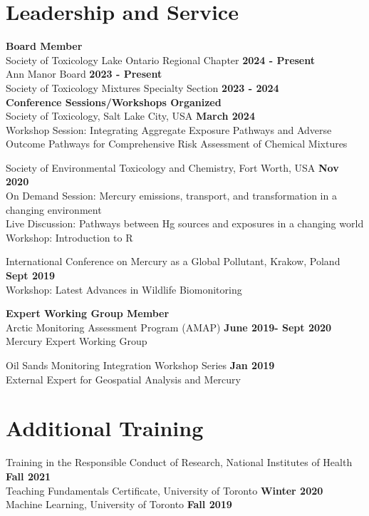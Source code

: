 \documentclass[margin,line]{res}
\begin{document}
\begin{resume}
\vspace*{.1in}

\section{\sc Leadership and Service}
{\bf Board Member}\\
{Society of Toxicology Lake Ontario Regional Chapter} \hfill {\bf 2024 - Present}\\
{Ann Manor Board} \hfill {\bf 2023 - Present}\\
{Society of Toxicology Mixtures Specialty Section} \hfill {\bf 2023 - 2024}\\

{\bf Conference Sessions/Workshops Organized}\\
Society of Toxicology, Salt Lake City, USA \hfill {\bf  March 2024}\\
Workshop Session: Integrating Aggregate Exposure Pathways and Adverse Outcome Pathways for Comprehensive Risk Assessment of Chemical Mixtures

Society of Environmental Toxicology and Chemistry, Fort Worth, USA \hfill {\bf  Nov 2020}\\
On Demand Session: Mercury emissions, transport, and transformation in a changing environment\\
Live Discussion: Pathways between Hg sources and exposures in a changing world\\
Workshop: Introduction to R

International Conference on Mercury as a Global Pollutant, Krakow, Poland \hfill {\bf Sept 2019}\\
Workshop: Latest Advances in Wildlife Biomonitoring

{\bf Expert Working Group Member}\\
Arctic Monitoring Assessment Program (AMAP)
\hfill {\bf  June 2019- Sept 2020}\\
Mercury Expert Working Group

Oil Sands Monitoring Integration Workshop Series
\hfill {\bf  Jan 2019}\\
External Expert for Geospatial Analysis and Mercury

\vspace*{.1in}

\section{\sc Additional Training}
Training in the Responsible Conduct of Research, National Institutes of Health \hfill {\bf  Fall 2021}\\
Teaching Fundamentals Certificate, University of Toronto
\hfill {\bf  Winter 2020}\\
Machine Learning, University of Toronto
\hfill {\bf  Fall 2019}


\end{resume}
\end{document}
